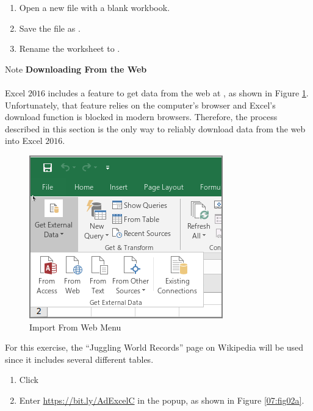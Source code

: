 \begin{enumerate}
	\item Open a new file with a blank workbook.
	\item Save the file as .
	\item Rename the  worksheet to .
	
\end{enumerate}

\begin{center}
	\begin{infobox}{Note}
		\textbf{Downloading From the Web}
		\\
		\\
		Excel $ 2016 $ includes a feature to get data from the web at , as shown in Figure \ref{07:fig01}. Unfortunately, that feature relies on the computer's browser and Excel's download function is blocked in modern browsers. Therefore, the process described in this section is the only way to reliably download data from the web into Excel $ 2016 $.
	\end{infobox}
\end{center}

\begin{figure}[H]
	\centering
	\includegraphics[width=\maxwidth{.95\linewidth}]{gfx/ch07_fig01}
	\caption{Import From Web Menu}
	\label{07:fig01}
\end{figure}

For this exercise, the ``Juggling World Records'' page on Wikipedia will be used since it includes several different tables.

\begin{enumerate}[resume]
	\item Click 
	\item Enter \url{https://bit.ly/AdExcelC} in the  popup, as shown in Figure \ref{07:fig02a}.
\end{enumerate}
	
